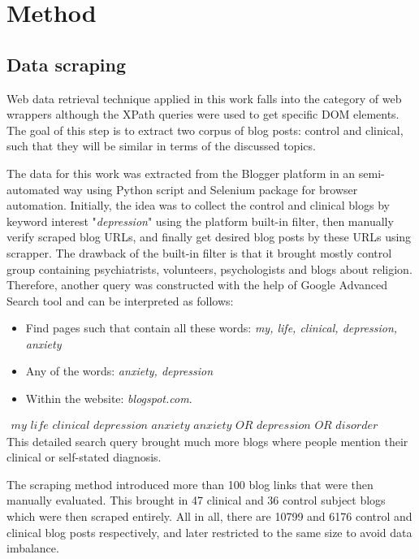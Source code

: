 \documentclass[12pt]{article}
\newcommand{\TODO}{\todo[inline]}
\begin{document}
\clearpage %
\section{Method} 
\subsection{Data scraping} 
\TODO{Scraping procedure flowchart}
Web data retrieval technique applied in this work falls into the category of web wrappers although the XPath queries were used to get specific DOM elements. The goal of this step is to extract two corpus of blog posts: control and clinical, such that they will be similar in terms of the discussed topics.

The data for this work was extracted from the Blogger platform in an semi-automated way using Python script and Selenium package for browser automation. Initially, the idea was to collect the control and clinical blogs by keyword interest "\textit{depression}" using the platform built-in filter, then manually verify scraped blog URLs, and finally get desired blog posts by these URLs using scrapper. The drawback of the built-in filter is that it brought mostly control group containing psychiatrists, volunteers, psychologists and blogs about religion. Therefore, another query was constructed with the help of Google Advanced Search tool and can be interpreted as follows: 
\begin{itemize}
	\item Find pages such that contain all these words: \textit{my, life, clinical, depression, anxiety}
	\item Any of the words: \textit{anxiety, depression}
	\item Within the website: \textit{blogspot.com}.
\end{itemize}
\begin{align*}
	\textit{my life clinical depression anxiety  anxiety OR depression OR disorder site:blogspot.com}
\end{align*}
 This detailed search query brought much more blogs where people mention their clinical or self-stated diagnosis.

 The scraping method introduced more than 100 blog links that were then manually evaluated. This brought in 47 clinical and 36 control subject blogs which were then scraped entirely. All in all, there are 10799 and 6176 control and clinical blog posts respectively, and later restricted to the same size to avoid data imbalance.
 
\end{document}
